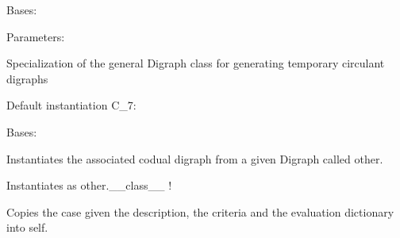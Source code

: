 \documentclass[letterpaper,10pt,english]{sphinxmanual}
\begin{document}
\begin{fulllineitems}
\label{techDoc:digraphs.CirculantDigraph}
Bases: {\hyperref[techDoc:digraphs.Digraph]{}}
\begin{description}
\item[{Parameters:}] \leavevmode
{}

\end{description}

Specialization of the general Digraph class for generating
temporary circulant digraphs
\begin{description}
\item[{Default instantiation C\_7:}] \leavevmode
{}

\end{description}

\begin{fulllineitems}
\label{techDoc:digraphs.CirculantDigraph.showShort}
\end{fulllineitems}


\end{fulllineitems}


\begin{fulllineitems}
\label{techDoc:digraphs.CoDualDigraph}
Bases: {\hyperref[techDoc:digraphs.Digraph]{}}

Instantiates the associated codual digraph from
a given Digraph called other.

Instantiates as other.\_\_class\_\_ !

Copies the case given the description, the criteria
and the evaluation dictionary into self.

\end{fulllineitems}
\end{document}

